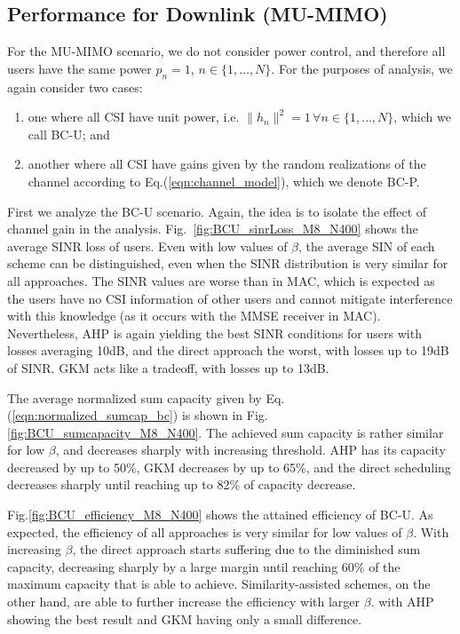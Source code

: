 \subsection{Performance for Downlink (MU-MIMO)}
For the MU-MIMO scenario, we do not consider power control, and therefore all users have the same power $p_n=1$, $n\in\{1,\ldots,N\}$. For the purposes of analysis, we again consider two cases: 
\begin{enumerate}
	\item one where all CSI have unit power, i.e. $\|h_n\|^2=1\,\forall n\in\{1,\ldots,N\}$, which we call BC-U; and
	\item another where all CSI have gains given by the random realizations of the channel according to Eq.(\ref{eqn:channel_model}), which we denote BC-P.
\end{enumerate}



First we analyze the BC-U scenario. Again, the idea is to isolate the effect of channel gain in the analysis.
Fig.~\ref{fig:BCU_sinrLoss_M8_N400} shows the average SINR loss of users. Even with low values of $\beta$, the average SIN of each scheme can be distinguished, even when the SINR distribution is very similar for all approaches. The SINR values are worse than in MAC, which is expected as the users have no CSI information of other users and cannot mitigate interference with this knowledge (as it occurs with the MMSE receiver in MAC). Nevertheless, AHP is again yielding the best SINR conditions for users with losses averaging 10dB, and the direct approach the worst, with losses up to 19dB of SINR. GKM acts like a tradeoff, with losses up to 13dB.

The average normalized sum capacity given by Eq.(\ref{eqn:normalized_sumcap_bc}) is shown in Fig.\ref{fig:BCU_sumcapacity_M8_N400}. The achieved sum capacity is rather similar for low $\beta$, and decreases sharply with increasing threshold. AHP has its capacity decreased by up to 50\%, GKM decreases by up to 65\%, and the direct scheduling decreases sharply until reaching  up to 82\% of capacity decrease.

Fig.\ref{fig:BCU_efficiency_M8_N400} shows the attained efficiency of BC-U. As expected, the efficiency of all approaches is very similar for low values of $\beta$. With increasing $\beta$, the direct approach starts suffering due to the diminished sum capacity, decreasing sharply by a large margin until reaching 60\% of the maximum capacity that is able to achieve. Similarity-assisted schemes, on the other hand, are able to further increase the efficiency with larger $\beta$. with AHP showing the best result and GKM having only a small difference.


